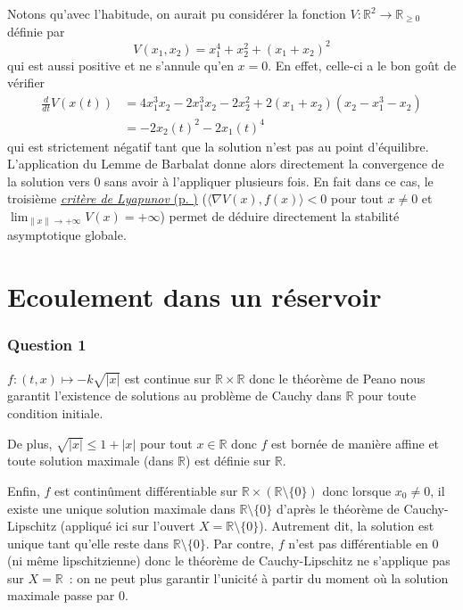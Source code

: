 Notons qu'avec l'habitude, on aurait pu considérer la fonction
\(V:\mathbb{R}^2\to \mathbb{R}_{\geq 0}\) définie par \[
V(x_1,x_2)= x_1^4 + x_2^2 + (x_1+x_2)^2
\] qui est aussi positive et ne s'annule qu'en \(x=0\). En effet,
celle-ci a le bon goût de vérifier \begin{align*}
\frac{d}{dt} V(x(t))  
&= 4x_1^3x_2 - 2 x_1^3x_2 - 2x_2^2 + 2(x_1+x_2)(x_2-x_1^3-x_2)\\
&= -2x_2(t)^2 -2 x_1(t)^4 
\end{align*} qui est strictement négatif tant que la solution n'est pas
au point d'équilibre. L'application du Lemme de Barbalat donne alors
directement la convergence de la solution vers 0 sans avoir à
l'appliquer plusieurs fois. En fait dans ce cas, le troisième
\protect\hyperlink{exo_lyap}{\emph{critère de Lyapunov} (p.
\pageref*{exo_lyap})} (\(\langle \nabla V(x) , f(x) \rangle<0\) pour
tout \(x\neq 0\) et \(\lim_{\|x\|\to +\infty} V(x) = +\infty\)) permet
de déduire directement la stabilité asymptotique globale.

\hypertarget{correc_Torricelli}{%
\section{Ecoulement dans un réservoir}\label{correc_Torricelli}}

\hypertarget{answer-tor-1}{%
\subsubsection*{Question 1}\label{answer-tor-1}}


\(f:(t,x)\mapsto -k\sqrt{|x|}\) est continue sur
\(\mathbb{R}\times \mathbb{R}\) donc le théorème de Peano nous garantit
l'existence de solutions au problème de Cauchy dans \(\mathbb{R}\) pour
toute condition initiale.

De plus, \(\sqrt{|x|}\leq 1+|x|\) pour tout \(x\in \mathbb{R}\) donc
\(f\) est bornée de manière affine et toute solution maximale (dans
\(\mathbb{R}\)) est définie sur \(\mathbb{R}\).

Enfin, \(f\) est continûment différentiable sur
\(\mathbb{R}\times (\mathbb{R}\setminus \{0\})\) donc lorsque
\(x_0\neq 0\), il existe une unique solution maximale dans
\(\mathbb{R}\setminus \{0\}\) d'après le théorème de Cauchy-Lipschitz
(appliqué ici sur l'ouvert \(X=\mathbb{R}\setminus \{0\}\)). Autrement
dit, la solution est unique tant qu'elle reste dans
\(\mathbb{R}\setminus \{0\}\). Par contre, \(f\) n'est pas
différentiable en 0 (ni même lipschitzienne) donc le théorème de
Cauchy-Lipschitz ne s'applique pas sur \(X=\mathbb{R}\)~: on ne peut
plus garantir l'unicité à partir du moment où la solution maximale passe
par 0.

